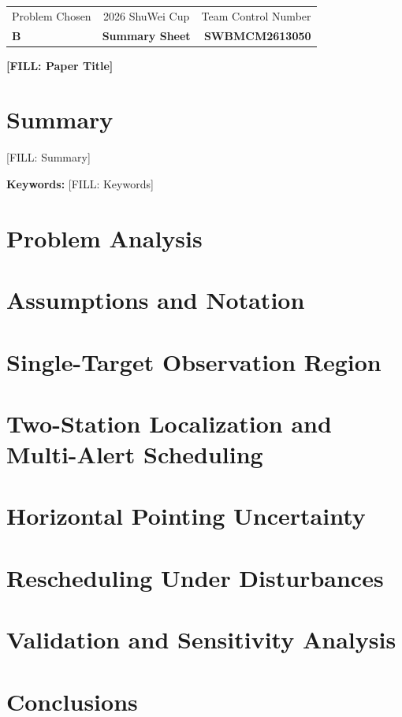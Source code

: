\documentclass[12pt,a4paper]{article}
\newcommand{\ProblemLetter}{B}
\newcommand{\TeamNumber}{SWBMCM2613050}
\newcommand{\PaperTitle}{[FILL: Paper Title]}
\begin{document}
\pagestyle{fancy}
\thispagestyle{empty}
\begin{center}
\begin{tabular*}{\textwidth}{@{\extracolsep{\fill}}lcr@{}}
  \toprule
  Problem Chosen & 2026 ShuWei Cup & Team Control Number\\
  \textbf{\ProblemLetter} & \textbf{Summary Sheet} & \textbf{\TeamNumber}\\
  \bottomrule
\end{tabular*}

\vspace{1em}
{\Large\bfseries\PaperTitle}
\end{center}
\section*{Summary}
[FILL: Summary]

\noindent\textbf{Keywords:} [FILL: Keywords]

\clearpage
\tableofcontents
\clearpage

\section{Problem Analysis}
\section{Assumptions and Notation}
\section{Single-Target Observation Region}
\section{Two-Station Localization and Multi-Alert Scheduling}
\section{Horizontal Pointing Uncertainty}
\section{Rescheduling Under Disturbances}
\section{Validation and Sensitivity Analysis}
\section{Conclusions}

\end{document}
